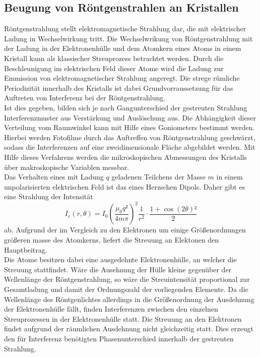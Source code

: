 \subsection{Beugung von Röntgenstrahlen an Kristallen}
%
Röntgenstrahlung stellt elektromagnetische Strahlung dar, die mit elektrischer Ladung in Wechselwirkung tritt. Die Wechselwrikung
von Röntgenstrahlung mit der Ladung in der Elektronenhülle und dem Atomkern eines Atoms in einem Kristall kann als klassischer
Streuprozess betrachtet werden. Durch die Beschleunigung im elektrischen Feld dieser Atome wird die Ladung zur Emmission von
elektromagnetischer Strahlung angeregt. Die strege rümliche Periodizität innerhalb des Kristalls ist dabei Grundvorraussetzung
für das Auftreten von Interferenz bei der Röntgenstrahlung.\\
Ist dies gegeben, bilden sich je nach Gangunterschied der gestreuten Strahlung Interferenzmuster aus Verstärkung und Auslöschung aus.
Die Abhängigkeit dieser Verteilung vom Raumwinkel kann mit Hilfe eines Goniometers bestimmt werden. Hierbei werden
Fotofilme durch das Auftreffen von Röntgenstrahlung geschwärzt, sodass die Interferenzen auf eine zweidimensionale
Fläche abgebildet werden. Mit Hilfe dieses Verfahrens werden die mikroskopischen Abmessungen des Kristalls über
makroskopische Variablen messbar.\\
Das Verhalten eines mit Ladung $q$ geladenen Teilchens der Masse $m$ in einem unpolarisierten elektrischen Feld ist
das eines Herzschen Dipols. Daher gibt es eine Strahlung der Intensität
%
\begin{equation}
  I_e(r,\theta)=I_0\left(\frac{\mu_0q²}{4m\pi}\right)^2\frac{1}{r^2}\cdot\frac{1+\cos(2\theta)²}{2}
\end{equation}
%
ab. Aufgrund der im Vergleich zu den Elektronen um einige Größenordnungen größeren masse des Atomkerns, liefert die Streuung an
Elektonen den Hauptbeitrag.\\
Die Atome besitzen dabei eine ausgedehnte Elektronenhülle, an welcher die Streuung stattfindet. Wäre die Ausehnung der
Hülle kleine gegenüber der Wellenlänge der Röntgenstrahlung, so wäre die Streuintensität proportional zur Gesamtladung
und damit der Ordnungszahl der vorliegenden Elemente. Da die Wellenlänge des Röntgenlichtes allerdings in die Größenordnung
der Ausdehnung der Elektronenhülle fällt, finden Interferenzen zwischen den einzelnen Streuprozessen in der Elektronenhülle
statt. Die Streuung an den Elektronen findet aufgrund der räumlichen Ausdehnung nicht gleichzeitig statt. Dies erzeugt den
für Interferenz benötigten Phasenunterschied innerhalb der gestreuten Strahlung.\\
